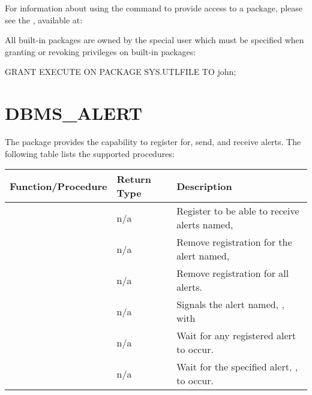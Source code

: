 \documentclass[letterpaper,10pt,english,openany,oneside]{sphinxmanual}
\begin{document}
For information about using the  command to provide access to a
package, please see the , available at:


All built-in packages are owned by the special  user which must be
specified when granting or revoking privileges on built-in packages:

%
\begin{sphinxVerbatim}[commandchars=\\\{\}]
GRANT EXECUTE ON PACKAGE SYS.UTL\PYGZus{}FILE TO john;
\end{sphinxVerbatim}

\newpage


\section{DBMS\_ALERT}
\label{\detokenize{dbms_alert::doc}}\label{\detokenize{dbms_alert:dbms-alert}}
The  package provides the capability to register for, send,
and receive alerts. The following table lists the supported procedures:


\begin{savenotes}\sphinxattablestart
\centering
\begin{tabulary}{\linewidth}[t]{|T|T|T|}
\hline

Function/Procedure
&
Return Type
&
Description
\\
\hline
{}
&
n/a
&
Register to be able to receive alerts named, 
\\
\hline
{}
&
n/a
&
Remove registration for the alert named, 
\\
\hline
{}
&
n/a
&
Remove registration for all alerts.
\\
\hline
{}
&
n/a
&
Signals the alert named, , with 
\\
\hline
{}
&
n/a
&
Wait for any registered alert to occur.
\\
\hline
{}
&
n/a
&
Wait for the specified alert, , to occur.
\\
\hline
\end{tabulary}
\par
\sphinxattableend\end{savenotes}
\end{document}
